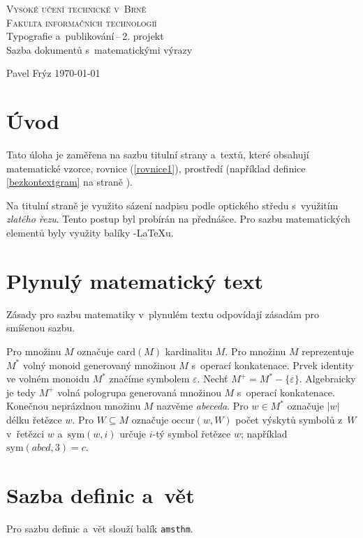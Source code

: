 \documentclass[11pt,a4paper,twocolumn]{article}
\begin{document}
\begin{titlepage}
  \begin{center}
    \LARGE \textsc{Vysoké učení technické v~Brně             \\
    \Large         Fakulta informačních technologií          \\
    }
    \LARGE         Typografie a~publikování\,--\,2. projekt  \\
    \Huge          Sazba dokumentů s~matematickými výrazy    \\
  \end{center}
  \Large           Pavel Frýz \hfill \today
\end{titlepage}

\section{Úvod}
  Tato úloha je zaměřena na sazbu titulní strany a~textů, které obsahují matematické
  vzorce, rovnice (\ref{rovnice1}), prostředí (například definice \ref{bezkontextgram}
  na straně \pageref{bezkontextgram}).

  Na titulní straně je využito sázení nadpisu podle optického středu s~využitím
  \emph{zlatého řezu}. Tento postup byl probírán na přednášce. Pro sazbu matematických
  elementů byly využity balíky \AmS-\LaTeX u.

\section{Plynulý matematický text}
  Zásady pro sazbu matematiky v~plynulém textu odpovídají zásadám pro smíšenou sazbu.

  Pro množinu $M$ označuje $\mathrm{card}(M)$ kardinalitu $M$. Pro množinu $M$
  reprezentuje $M^*$ volný monoid generovaný množinou $M$ s~operací konkatenace. Prvek
  identity ve volném monoidu $M^*$ značíme symbolem $\varepsilon$. Nechť $M^+ = M^* -
  \{ \varepsilon \}$. Algebraicky je tedy $M^+$ volná pologrupa generovaná množinou $M$
  s~operací konkatenace. Konečnou neprázdnou množinu $M$ nazvěme \emph{abeceda}. Pro
  $w \in M^*$ označuje $|w|$ délku řetězce $w$. Pro $W \subseteq M$ označuje
  $\mathrm{occur}(w,W)$ počet výskytů symbolů z~$W$ v~řetězci $w$ a~$\mathrm{sym}(w,i)$
  určuje $i$-tý symbol řetězce $w$; například $\mathrm{sym}(abcd,3) = c$.

\section{Sazba definic a~vět}
  Pro sazbu definic a~vět slouží balík \texttt{amsthm}.
\end{document}
